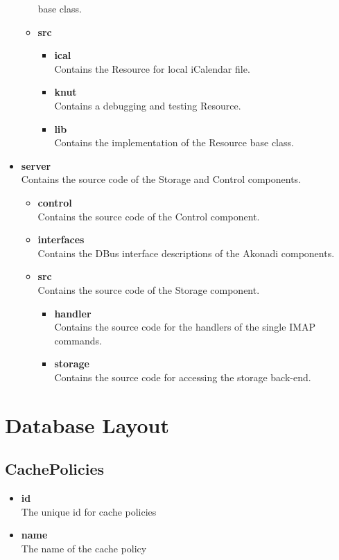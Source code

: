 \documentclass[]{report}
\begin{document}
\begin{itemize}
\begin{itemize}
      base class.
    \item \textbf{src}\\
    \begin{itemize}
      \item \textbf{ical}\\
        Contains the Resource for local iCalendar file.
      \item \textbf{knut}\\
        Contains a debugging and testing Resource.
      \item \textbf{lib}\\
        Contains the implementation of the Resource base class.
    \end{itemize}
  \end{itemize}
  \item \textbf{server}\\
    Contains the source code of the Storage and Control components.
  \begin{itemize}
    \item \textbf{control}\\
      Contains the source code of the Control component.
    \item \textbf{interfaces}\\
      Contains the DBus interface descriptions of the Akonadi components.
    \item \textbf{src}\\
      Contains the source code of the Storage component.
    \begin{itemize}
      \item \textbf{handler}\\
        Contains the source code for the handlers of the single IMAP commands.
      \item \textbf{storage}\\
        Contains the source code for accessing the storage back-end.
    \end{itemize}
  \end{itemize}
\end{itemize}

\section{Database Layout}

\subsection{CachePolicies}
\begin{itemize}
  \item \textbf{id}\\
    The unique id for cache policies
  \item \textbf{name}\\
    The name of the cache policy
\end{itemize}
\end{document}
